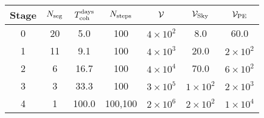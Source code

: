 \begin{tabular}{c|cccccc}
Stage & $N_{\rm seg}$ & $T_{\rm coh}^{\rm days}$ &$N_{\rm steps}$ & $\mathcal{V}$ & $\mathcal{V}_{\rm Sky}$ & $\mathcal{V}_{\rm PE}$ \\ \hline
0 & 20 & 5.0 & 100 & $4{\times}10^{2}$ & 8.0 & 60.0 \\
1 & 11 & 9.1 & 100 & $4{\times}10^{3}$ & 20.0 & $2{\times}10^{2}$ \\
2 & 6 & 16.7 & 100 & $4{\times}10^{4}$ & 70.0 & $6{\times}10^{2}$ \\
3 & 3 & 33.3 & 100 & $3{\times}10^{5}$ & $1{\times}10^{2}$ & $2{\times}10^{3}$ \\
4 & 1 & 100.0 & 100,100 & $2{\times}10^{6}$ & $2{\times}10^{2}$ & $1{\times}10^{4}$ \\
\end{tabular}
